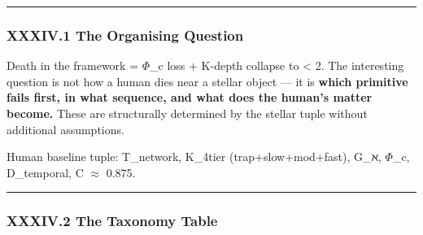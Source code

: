 \documentclass[12pt,a4paper]{article}
\begin{document}
\begin{center}
\rule{0.5\textwidth}{0.4pt}
\end{center}

\subsubsection{XXXIV.1 The Organising Question}

Death in the framework = $\Phi$\_c loss + K-depth collapse to \textless{} 2. The interesting question is not how a human dies near a stellar object --- it is \textbf{which primitive fails first, in what sequence, and what does the human's matter become.} These are structurally determined by the stellar tuple without additional assumptions.

Human baseline tuple: T\_network, K\_4tier (trap+slow+mod+fast), G\_ℵ, $\Phi$\_c, D\_temporal, C $\approx$ 0.875.

\begin{center}
\rule{0.5\textwidth}{0.4pt}
\end{center}

\subsubsection{XXXIV.2 The Taxonomy Table}
\end{document}
